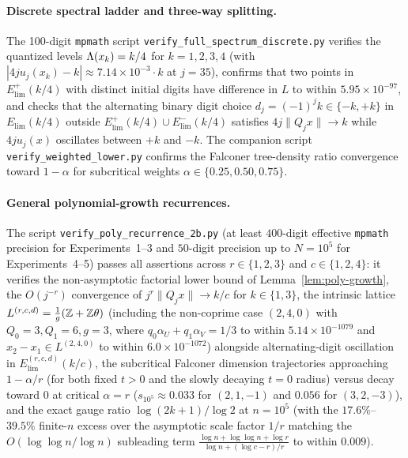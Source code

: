 \paragraph{Discrete spectral ladder and three-way splitting.} The 100-digit
\texttt{mpmath} script \texttt{verify\_\allowbreak full\_\allowbreak spectrum\_\allowbreak discrete.py} verifies
the quantized levels $\Lambda(x_k)=k/4$ for $k=1,2,3,4$ (with $|4ju_j(x_k)-k|\approx7.14\times10^{-3}\cdot k$ at $j=35$), confirms that two points in
$E_{\mathrm{lim}}^+(k/4)$ with distinct initial digits have difference in $L$ to
within $5.95\times10^{-97}$, and checks that the alternating binary digit choice
$d_j=(-1)^j k\in\{-k,+k\}$ in $E_{\mathrm{lim}}(k/4)$ outside $E_{\mathrm{lim}}^+(k/4)\cup E_{\mathrm{lim}}^-(k/4)$ satisfies $4j\|Q_jx\|\to k$ while $4ju_j(x)$ oscillates
between $+k$ and $-k$. The companion script \texttt{verify\_\allowbreak weighted\_\allowbreak lower.py}
confirms the Falconer tree-density ratio convergence toward $1-\alpha$ for
subcritical weights $\alpha\in\{0.25,0.50,0.75\}$.

\paragraph{General polynomial-growth recurrences.} The script
\texttt{verify\_\allowbreak poly\_\allowbreak recurrence\_\allowbreak 2b.py}
(at least $400$-digit effective \texttt{mpmath} precision for Experiments~1--3
and $50$-digit precision up to $N=10^5$ for Experiments~4--5) passes all
assertions across $r\in\{1,2,3\}$ and $c\in\{1,2,4\}$: it verifies the
non-asymptotic factorial lower bound of Lemma~\ref{lem:poly-growth}, the
$O(j^{-r})$ convergence of $j^r\|Q_jx\|\to k/c$ for $k\in\{1,3\}$, the
intrinsic lattice $L^{(r,c,d)}=\frac{1}{g}(\mathbb{Z}+\mathbb{Z}\theta)$ (including the
non-coprime case $(2,4,0)$ with $Q_0=3,Q_1=6,g=3$, where
$q_0\alpha_U+q_1\alpha_V=1/3$ to within $5.14\times10^{-1079}$ and $x_2-x_1\in
L^{(2,4,0)}$ to within $6.0\times10^{-1072}$) alongside alternating-digit
oscillation in $E_{\mathrm{lim}}^{(r,c,d)}(k/c)$, the subcritical Falconer
dimension trajectories approaching $1-\alpha/r$ (for both fixed $t>0$ and the
slowly decaying $t=0$ radius) versus decay toward $0$ at critical $\alpha=r$
($s_{10^5}\approx0.033$ for $(2,1,-1)$ and $0.056$ for $(3,2,-3)$), and the
exact gauge ratio $\log(2k+1)/\log2$ at $n=10^5$ (with the $17.6\%$--$39.5\%$
finite-$n$ excess over the asymptotic scale factor $1/r$ matching the
$O(\log\log n/\log n)$ subleading term $\frac{\log n+\log\log n+\log r}{\log n+(\log c-r)/r}$
to within $0.009$).

